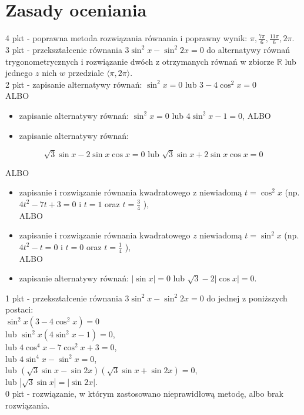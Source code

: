 \documentclass[10pt]{article}
\begin{document}
\section*{Zasady oceniania}
4 pkt - poprawna metoda rozwiązania równania i poprawny wynik: $\pi, \frac{7 \pi}{6}, \frac{11 \pi}{6}, 2 \pi$.\\
3 pkt - przekształcenie równania $3 \sin ^{2} x-\sin ^{2} 2 x=0$ do alternatywy równań\\
trygonometrycznych i rozwiązanie dwóch z otrzymanych równań w zbiorze $\mathbb{R}$ lub jednego $z$ nich $w$ przedziale $\langle\pi, 2 \pi\rangle$.\\
2 pkt - zapisanie alternatywy równań: $\sin ^{2} x=0$ lub $3-4 \cos ^{2} x=0$\\
ALBO

\begin{itemize}
  \item zapisanie alternatywy równań: $\sin ^{2} x=0$ lub $4 \sin ^{2} x-1=0$, ALBO
  \item zapisanie alternatywy równań:
\end{itemize}

$$
\sqrt{3} \sin x-2 \sin x \cos x=0 \text { lub } \sqrt{3} \sin x+2 \sin x \cos x=0
$$

ALBO

\begin{itemize}
  \item zapisanie i rozwiązanie równania kwadratowego z niewiadomą $t=\cos ^{2} x$ (np.\\
$4 t^{2}-7 t+3=0$ i $t=1$ oraz $t=\frac{3}{4}$ ),\\
ALBO
  \item zapisanie i rozwiązanie równania kwadratowego $z$ niewiadomą $t=\sin ^{2} x$ (np.\\
$4 t^{2}-t=0$ i $t=0$ oraz $t=\frac{1}{4}$ ),\\
ALBO
  \item zapisanie alternatywy równań: $|\sin x|=0$ lub $\sqrt{3}-2|\cos x|=0$.
\end{itemize}

1 pkt - przekształcenie równania $3 \sin ^{2} x-\sin ^{2} 2 x=0$ do jednej z poniższych postaci:\\
$\sin ^{2} x\left(3-4 \cos ^{2} x\right)=0$\\
lub $\sin ^{2} x\left(4 \sin ^{2} x-1\right)=0$,\\
lub $4 \cos ^{4} x-7 \cos ^{2} x+3=0$,\\
lub $4 \sin ^{4} x-\sin ^{2} x=0$,\\
lub $(\sqrt{3} \sin x-\sin 2 x)(\sqrt{3} \sin x+\sin 2 x)=0$,\\
lub $|\sqrt{3} \sin x|=|\sin 2 x|$.\\
0 pkt - rozwiązanie, w którym zastosowano nieprawidłową metodę, albo brak rozwiązania.
\end{document}
